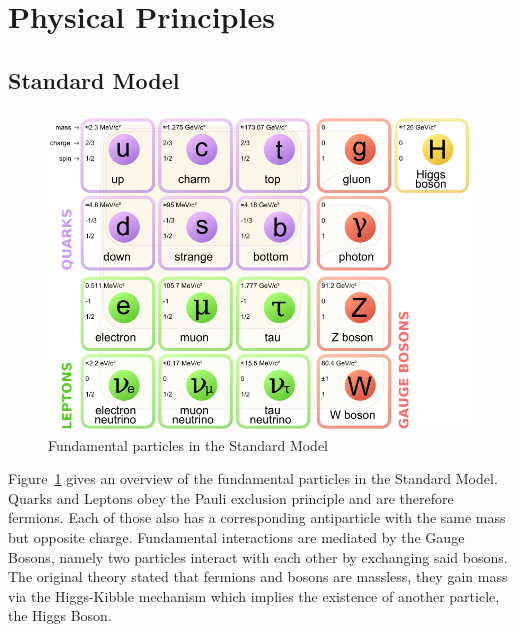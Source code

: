 
\section{Physical Principles}
\subsection{Standard Model}
\begin{figure}[hb]
	\centering
	\includegraphics[scale=0.25]{graphics/Standard_Model_of_Elementary_Particles.png}
	\caption{Fundamental particles in the Standard Model}
	\label{fig:principles:Standard_Model_of_Elementary_Particles}
\end{figure}

Figure~\ref{fig:principles:Standard_Model_of_Elementary_Particles} gives an overview of the fundamental particles in the Standard Model. Quarks and Leptons obey the Pauli exclusion principle and are therefore fermions. Each of those also has a corresponding antiparticle with the same mass but opposite charge. Fundamental interactions are mediated by the Gauge Bosons, namely two particles interact with each other by exchanging said bosons. The original theory stated that fermions and bosons are massless, they gain mass via the Higgs-Kibble mechanism which implies the existence of another particle, the Higgs Boson\cite{muenchen}.

